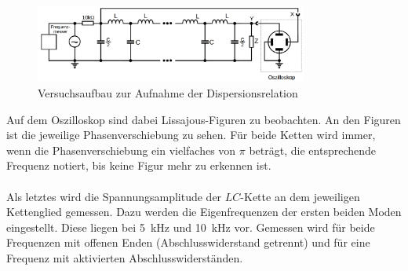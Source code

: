 \documentclass[
  bibliography=totoc,     %
  captions=tableheading,  %
  titlepage=firstiscover, %
]{scrartcl}
\begin{document}
\begin{figure}
  \centering
  \includegraphics[width=0.8\textwidth]{V3569.png}
  \caption{Versuchsaufbau zur Aufnahme der Dispersionsrelation }
  \label{fig:V3569}
\end{figure}
Auf dem Oszilloskop sind dabei Lissajous-Figuren zu beobachten. An den Figuren
ist die jeweilige Phasenverschiebung zu sehen. Für beide Ketten wird immer, wenn
die Phasenverschiebung ein vielfaches von $\pi$ beträgt, die entsprechende
Frequenz notiert, bis keine Figur mehr zu erkennen ist.\\
\\
Als letztes wird die Spannungsamplitude der $LC$-Kette an dem jeweiligen
Kettenglied gemessen. Dazu werden die Eigenfrequenzen der ersten beiden Moden
eingestellt. Diese liegen bei \SI{5}{\kilo\hertz} und \SI{10}{\kilo\hertz} vor.
Gemessen wird für beide Frequenzen mit offenen Enden
(Abschlusswiderstand getrennt) und für eine Frequenz mit aktivierten
Abschlusswiderständen.
\end{document}
